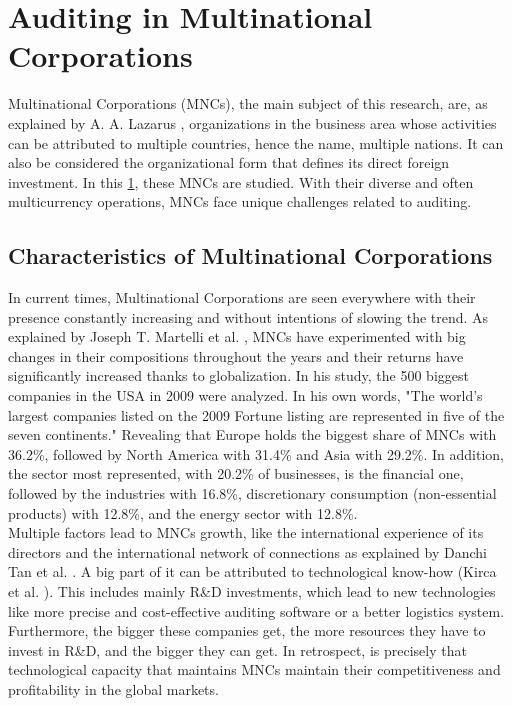 \chapter{Auditing in Multinational Corporations}
\label{ch:multinationals}

Multinational Corporations (MNCs), the main subject of this research, are, as explained by A. A. Lazarus \cite{MCsDefinition}, organizations in the business area whose activities can be attributed to multiple countries, hence the name, multiple nations. It can also be considered the organizational form that defines its direct foreign investment. In this \cref{ch:multinationals}, these MNCs are studied. With their diverse and often multicurrency operations, MNCs face unique challenges related to auditing.

\section{Characteristics of Multinational Corporations}

In current times, Multinational Corporations are seen everywhere with their presence constantly increasing and without intentions of slowing the trend. As explained by Joseph T. Martelli et al. \cite{growthMNCs}, MNCs have experimented with big changes in their compositions throughout the years and their returns have significantly increased thanks to globalization. In his study, the 500 biggest companies in the USA in 2009 were analyzed. In his own words, "The world’s largest companies listed on the 2009 Fortune listing are represented in five of the seven continents." Revealing that Europe holds the biggest share of MNCs with 36.2\%, followed by North America with 31.4\% and Asia with 29.2\%. In addition, the sector most represented, with 20.2\% of businesses, is the financial one, followed by the industries with 16.8\%, discretionary consumption (non-essential products) with 12.8\%, and the energy sector with 12.8\%. \\

Multiple factors lead to MNCs growth, like the international experience of its directors and the international network of connections as explained by Danchi Tan et al. \cite{DataGrowthMNCs}. A big part of it can be attributed to technological know-how (Kirca et al. \cite{technicalKnowHow}). This includes mainly R\&D investments, which lead to new technologies like more precise and cost-effective auditing software or a better logistics system. Furthermore, the bigger these companies get, the more resources they have to invest in R\&D, and the bigger they can get. In retrospect, is precisely that technological capacity that maintains MNCs maintain their competitiveness and profitability in the global markets. \\

